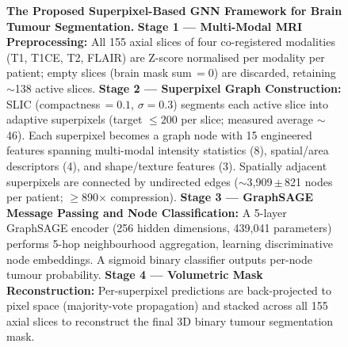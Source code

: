 \documentclass{article}
\begin{document}
\begin{figure}[htbp]
\centering
{}
\caption{\textbf{The Proposed Superpixel-Based GNN Framework for Brain Tumour Segmentation.}
\textbf{Stage 1 — Multi-Modal MRI Preprocessing:} All 155 axial slices of four co-registered modalities (T1, T1CE, T2, FLAIR) are Z-score normalised per modality per patient; empty slices (brain mask sum\,$=0$) are discarded, retaining $\sim$138 active slices.
\textbf{Stage 2 — Superpixel Graph Construction:} SLIC (compactness\,$=0.1$, $\sigma=0.3$) segments each active slice into adaptive superpixels (target $\leq 200$ per slice; measured average $\sim$46). Each superpixel becomes a graph node with 15 engineered features spanning multi-modal intensity statistics (8), spatial/area descriptors (4), and shape/texture features (3). Spatially adjacent superpixels are connected by undirected edges ($\sim$3{,}909\,$\pm$\,821 nodes per patient; $\geq$890$\times$ compression).
\textbf{Stage 3 — GraphSAGE Message Passing and Node Classification:} A 5-layer GraphSAGE encoder (256 hidden dimensions, 439{,}041 parameters) performs 5-hop neighbourhood aggregation, learning discriminative node embeddings. A sigmoid binary classifier outputs per-node tumour probability.
\textbf{Stage 4 — Volumetric Mask Reconstruction:} Per-superpixel predictions are back-projected to pixel space (majority-vote propagation) and stacked across all 155 axial slices to reconstruct the final 3D binary tumour segmentation mask.}
\label{fig:framework}
\end{figure}
\end{document}
